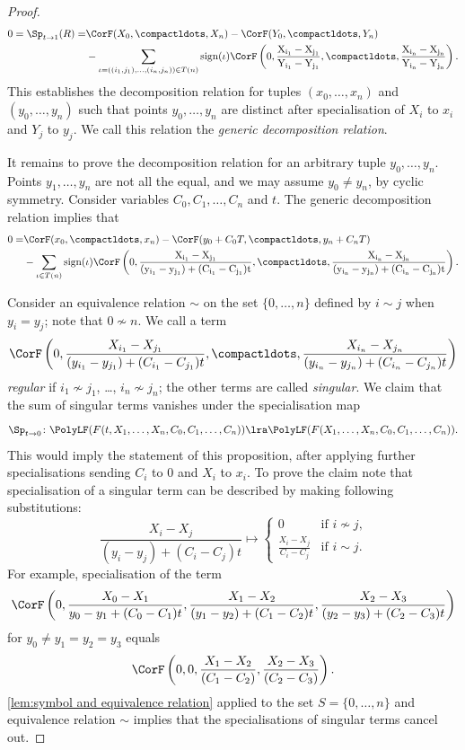 \documentclass[a4paper]{amsart}
\begin{document}
\begin{proof}
\begin{align*}
 0=\Sp_{t\to 1}(R)= &\CorF(X_0,\compactldots,X_n)-\CorF(Y_0,\compactldots,Y_n)\\
     &-\sum_{\iota=((i_1,j_1),\dots,(i_{n},j_n))\in T(n)}\rm{sign}(\iota)
     \CorF\left(0,\frac{X_{i_1}-X_{j_1}}{Y_{i_1}-Y_{j_1}},\compactldots,\frac{X_{i_n}-X_{j_n}}{Y_{i_n}-Y_{j_n}}\right).
\end{align*}
This establishes the decomposition relation for tuples $(x_0,\dots,x_n)$ and $(y_0,\dots,y_n)$ such that points $y_0,\dots,y_n$ are distinct after specialisation of $X_i$ to $x_i$ and $Y_j$ to $y_j$. We call this relation the \emph{generic decomposition relation}. 

It remains to prove the decomposition relation for an arbitrary tuple $y_0,\dots,y_n$. Points $y_1,\dots,y_n$ are not all the equal, and we may assume $y_0\neq y_n$, by cyclic symmetry. Consider variables $C_0,C_1,\ldots,C_n$ and $t$. The generic decomposition relation implies that 
\begin{align*}
 0= &\CorF(x_0,\compactldots,x_n)-\CorF(y_0+C_0 T,\compactldots,y_n+C_n T)\\
     &-\sum_{\iota\in T(n)}\rm{sign}(\iota)
     \CorF\left(0,\frac{X_{i_1}-X_{j_1}}{(y_{i_1}-y_{j_1})+(C_{i_1}-C_{j_1})t},\compactldots,\frac{X_{i_n}-X_{j_n}}{(y_{i_n}-y_{j_n})+(C_{i_n}-C_{j_n})t}\right).
\end{align*}

Consider an equivalence relation $\sim$ on the set $\{0,\dots,n\}$ defined by $i\sim j$ when $y_i=y_j$; note that $0 \not \sim n$. We call a term 
\[
\CorF\left(0,\frac{X_{i_1}-X_{j_1}}{(y_{i_1}-y_{j_1})+(C_{i_1}-C_{j_1})t},\compactldots,\frac{X_{i_n}-X_{j_n}}{(y_{i_n}-y_{j_n})+(C_{i_n}-C_{j_n})t}\right)
\]
\emph{regular} if $i_1 \not \sim j_1$, \dots,  $i_n \not \sim j_n$; the other terms are called \emph{singular}. We claim that the sum of singular terms vanishes under the specialisation map
\[
\Sp_{t\to 0}\colon  \PolyLF(F(t,X_1,\dots,X_n,C_0,C_1,\dots,C_n))\lra  \PolyLF(F(X_1,\dots,X_n,C_0,C_1,\dots,C_n)).
\]
This would imply the statement of this proposition, after applying further specialisations sending $C_i$ to $0$ and $X_i$ to $x_i$. To prove the claim note that specialisation of a singular term can be described by making following substitutions:
\[\frac{X_{i}-X_{j}}{(y_{i}-y_{j})+(C_{i}-C_{j})t} \longmapsto \begin{cases} 0 & \text{if $i \not \sim j$,} \\
\frac{X_{i}-X_{j}}{C_{i}-C_{j}} & \text{if $i \sim j$.}\end{cases}\]
For example, specialisation of the term
\[
\CorF\left(0,\frac{X_{0}-X_{1}}{y_{0}-y_{1}+(C_{0}-C_{1})t},\frac{X_{1}-X_{2}}{(y_{1}-y_{2})+(C_{1}-C_{2})t},\frac{X_{2}-X_{3}}{(y_{2}-y_{3})+(C_{2}-C_{3})t}\right)
\]
for $y_0\neq y_1=y_2=y_3$ equals 
\[
\CorF\left(0,0,\frac{X_{1}-X_{2}}{(C_{1}-C_{2})},\frac{X_{2}-X_{3}}{(C_{2}-C_{3})}\right).
\]
\cref{lem:symbol and equivalence relation} applied to the set $S=\{0, \dots,n\}$ and equivalence relation $\sim$ implies that the specialisations of singular terms cancel out.
\end{proof}
\end{document}
